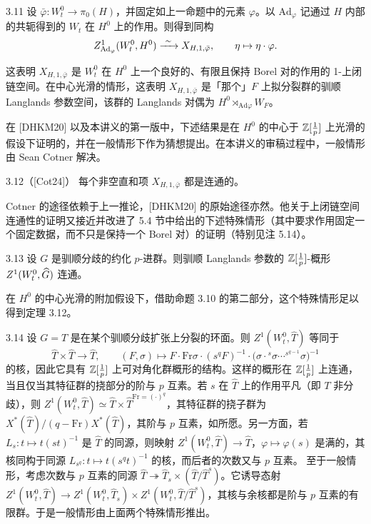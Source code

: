 \begin{cor}{3.11}\label{cor:dat-3-11}
设 $\bar\varphi:W^0_t\to\pi_0(H)$，并固定如上一命题中的元素 $\varphi$。以 $\mathrm{Ad}_\varphi$ 记通过 $H$ 内部的共轭得到的 $W_t$ 在 $H^0$ 上的作用。则得到同构
\[
Z^1_{\mathrm{Ad}_\varphi}(W^0_t,H^0)\xrightarrow{\ \sim\ } X_{H,1,\bar\varphi},\qquad \eta\mapsto\eta\cdot\varphi.
\]
\end{cor}

这表明 $X_{H,1,\bar\varphi}$ 是 $W^0_t$ 在 $H^0$ 上一个良好的、有限且保持 Borel 对的作用的 1-上闭链空间。在中心光滑的情形，这表明 $X_{H,1,\bar\varphi}$ 是「那个」$F$ 上拟分裂群的驯顺 Langlands 参数空间，该群的 Langlands 对偶为 $H^0\rtimes_{\mathrm{Ad}\varphi}W_F$。

在 [DHKM20] 以及本讲义的第一版中，下述结果是在 $H^0$ 的中心于 $\mathbb{Z}[\frac1p]$ 上光滑的假设下证明的，并在一般情形下作为猜想提出。在本讲义的审稿过程中，一般情形由 Sean Cotner 解决。

\begin{thm}{3.12}（[Cot24]）\label{thm:dat-3-12}
每个非空直和项 $X_{H,1,\bar\varphi}$ 都是连通的。
\end{thm}

Cotner 的途径依赖于上一推论，[DHKM20] 的原始途径亦然。他关于上闭链空间连通性的证明又接近并改进了 5.4 节中给出的下述特殊情形（其中要求作用固定一个固定数据，而不只是保持一个 Borel 对）的证明（特别见注 5.14）。

\begin{thm}{3.13}\label{thm:dat-3-13}
设 $G$ 是驯顺分歧的约化 $p$-进群。则驯顺 Langlands 参数的 $\mathbb{Z}[\frac1p]$-概形 $Z^1(W^0_t,\widehat{G})$ 连通。
\end{thm}

在 $H^0$ 的中心光滑的附加假设下，借助命题 3.10 的第二部分，这个特殊情形足以得到定理 3.12。

\begin{exam}{3.14}\label{ex:dat-3-14}
设 $G=T$ 是在某个驯顺分歧扩张上分裂的环面。则 $Z^1(W^0_t,\hat T)$ 等同于
\[
\hat T\times\hat T\longrightarrow\hat T,\qquad (F,\sigma)\mapsto F\cdot\mathrm{Fr}\sigma\cdot(s^qF)^{-1}\cdot\bigl(\sigma\cdot{}^s\sigma\cdots{}^{s^{q-1}}\sigma\bigr)^{-1}
\]
的核，因此它具有 $\mathbb{Z}[\frac1p]$ 上可对角化群概形的结构。这样的概形在 $\mathbb{Z}[\frac1p]$ 上连通，当且仅当其特征群的挠部分的阶与 $p$ 互素。若 $s$ 在 $\hat T$ 上的作用平凡（即 $T$ 非分歧），则 $Z^1(W^0_t,\hat T)\simeq\hat T\times\hat T^{\mathrm{Fr}=(\cdot)^q}$，其特征群的挠子群为 $X^*(\hat T)/(q-\mathrm{Fr})X^*(\hat T)$，其阶与 $p$ 互素，如所愿。另一方面，若 $L_s:t\mapsto t(st)^{-1}$ 是 $\hat T$ 的同源，则映射 $Z^1(W^0_t,\hat T)\to\hat T$，$\varphi\mapsto\varphi(s)$ 是满的，其核同构于同源 $L_{s^q}:t\mapsto t(s^qt)^{-1}$ 的核，而后者的次数又与 $p$ 互素。
至于一般情形，考虑次数与 $p$ 互素的同源 $\hat T\twoheadrightarrow\hat T_s\times(\hat T/\hat T^s)$。它诱导态射 $Z^1(W^0_t,\hat T)\to Z^1(W^0_t,\hat T_s)\times Z^1(W^0_t,\hat T/\hat T^s)$，其核与余核都是阶与 $p$ 互素的有限群。于是一般情形由上面两个特殊情形推出。
\end{exam}


